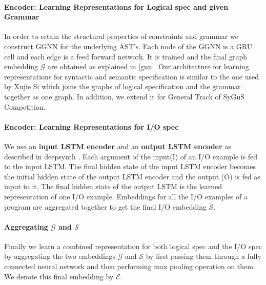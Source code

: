 \paragraph{Encoder: Learning Representations for Logical spec and given Grammar}
In order to retain the structural properties of constraints and grammar we construct GGNN for the underlying AST's. Each node of the GGNN is a GRU cell and each edge is a feed forward network. It is trained and the final graph embedding $\mathcal{G}$ are obtained as explained in \ref{gnn}. Our architecture for learning representations for syntactic and semantic specification is similar to the one used by Xujie Si \cite{si2018learning} which joins the graphs of logical specification and the grammar together as one graph. In addition, we extend it for General Track of SyGuS Competition.

\paragraph{Encoder: Learning Representations for I/O spec}
We use an \textbf{input LSTM encoder} and an \textbf{output LSTM encoder} as described in deepsynth \cite{polgreen2020counterexample}. Each argument of the input(I) of an I/O example is fed to the input LSTM. The final hidden state of the input LSTM encoder becomes the initial hidden state of the output LSTM encoder and the output (O) is fed as input to it. The final hidden state of the output LSTM is the learned representation of one I/O example. Embeddings for all the I/O examples of a program are aggregated together to get the final I/O embedding $\mathcal{S}$.

\paragraph{Aggregating $\mathcal{G}$ and $\mathcal{S}$}
Finally we learn a combined representation for both logical spec and the I/O spec by aggregating the two embeddings $\mathcal{G}$ and $\mathcal{S}$ by first passing them through a fully connected neural network and then performing max pooling operation on them. We denote this final embedding by $\mathcal{E}$. %

